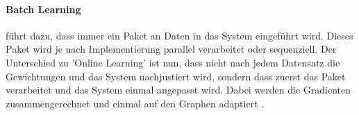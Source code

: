 \paragraph{Batch Learning} 
führt dazu, dass immer ein Paket an Daten in das System eingeführt wird. 
Dieses Paket wird je nach Implementierung parallel verarbeitet oder sequenziell. 
Der Unterschied zu 'Online Learning' ist nun, dass nicht nach jedem Datensatz die Gewichtungen und das System nachjustiert wird, sondern dass zuerst das Paket verarbeitet und das System einmal angepasst wird. 
Dabei werden die Gradienten zusammengerechnet und einmal auf den Graphen adaptiert \cite{AI3}. 